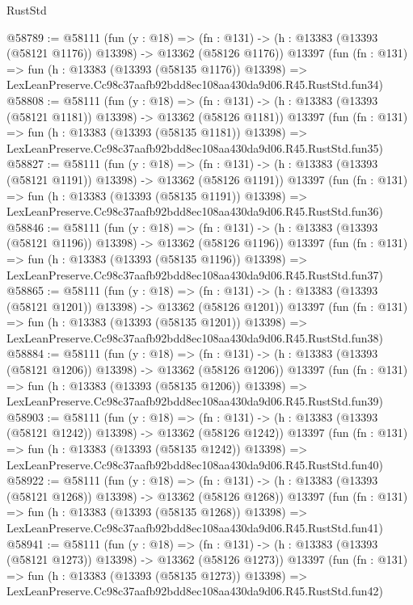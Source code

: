 \begin{lexlean}{RustStd}
\begin{coremodule}
@58789 := @58111
    (fun (y : @18) =>
    (fn : @131) -> (h : @13383 (@13393 (@58121 @1176)) @13398) -> @13362 (@58126 @1176))
    @13397
    (fun (fn : @131) =>
    fun (h : @13383 (@13393 (@58135 @1176)) @13398) =>
    LexLeanPreserve.Cc98c37aafb92bdd8ec108aa430da9d06.R45.RustStd.fun34)
@58808 := @58111
    (fun (y : @18) =>
    (fn : @131) -> (h : @13383 (@13393 (@58121 @1181)) @13398) -> @13362 (@58126 @1181))
    @13397
    (fun (fn : @131) =>
    fun (h : @13383 (@13393 (@58135 @1181)) @13398) =>
    LexLeanPreserve.Cc98c37aafb92bdd8ec108aa430da9d06.R45.RustStd.fun35)
@58827 := @58111
    (fun (y : @18) =>
    (fn : @131) -> (h : @13383 (@13393 (@58121 @1191)) @13398) -> @13362 (@58126 @1191))
    @13397
    (fun (fn : @131) =>
    fun (h : @13383 (@13393 (@58135 @1191)) @13398) =>
    LexLeanPreserve.Cc98c37aafb92bdd8ec108aa430da9d06.R45.RustStd.fun36)
@58846 := @58111
    (fun (y : @18) =>
    (fn : @131) -> (h : @13383 (@13393 (@58121 @1196)) @13398) -> @13362 (@58126 @1196))
    @13397
    (fun (fn : @131) =>
    fun (h : @13383 (@13393 (@58135 @1196)) @13398) =>
    LexLeanPreserve.Cc98c37aafb92bdd8ec108aa430da9d06.R45.RustStd.fun37)
@58865 := @58111
    (fun (y : @18) =>
    (fn : @131) -> (h : @13383 (@13393 (@58121 @1201)) @13398) -> @13362 (@58126 @1201))
    @13397
    (fun (fn : @131) =>
    fun (h : @13383 (@13393 (@58135 @1201)) @13398) =>
    LexLeanPreserve.Cc98c37aafb92bdd8ec108aa430da9d06.R45.RustStd.fun38)
@58884 := @58111
    (fun (y : @18) =>
    (fn : @131) -> (h : @13383 (@13393 (@58121 @1206)) @13398) -> @13362 (@58126 @1206))
    @13397
    (fun (fn : @131) =>
    fun (h : @13383 (@13393 (@58135 @1206)) @13398) =>
    LexLeanPreserve.Cc98c37aafb92bdd8ec108aa430da9d06.R45.RustStd.fun39)
@58903 := @58111
    (fun (y : @18) =>
    (fn : @131) -> (h : @13383 (@13393 (@58121 @1242)) @13398) -> @13362 (@58126 @1242))
    @13397
    (fun (fn : @131) =>
    fun (h : @13383 (@13393 (@58135 @1242)) @13398) =>
    LexLeanPreserve.Cc98c37aafb92bdd8ec108aa430da9d06.R45.RustStd.fun40)
@58922 := @58111
    (fun (y : @18) =>
    (fn : @131) -> (h : @13383 (@13393 (@58121 @1268)) @13398) -> @13362 (@58126 @1268))
    @13397
    (fun (fn : @131) =>
    fun (h : @13383 (@13393 (@58135 @1268)) @13398) =>
    LexLeanPreserve.Cc98c37aafb92bdd8ec108aa430da9d06.R45.RustStd.fun41)
@58941 := @58111
    (fun (y : @18) =>
    (fn : @131) -> (h : @13383 (@13393 (@58121 @1273)) @13398) -> @13362 (@58126 @1273))
    @13397
    (fun (fn : @131) =>
    fun (h : @13383 (@13393 (@58135 @1273)) @13398) =>
    LexLeanPreserve.Cc98c37aafb92bdd8ec108aa430da9d06.R45.RustStd.fun42)

\end{coremodule}
\end{lexlean}
